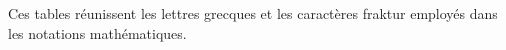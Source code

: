 \documentclass[../../include/open-logic-part]{subfiles}
\begin{document}
\begin{OLPartNotice}{}
Ces tables réunissent les lettres grecques et les caractères fraktur
employés dans les notations mathématiques.
\end{OLPartNotice}



\OLEndPartHook
\end{document}
